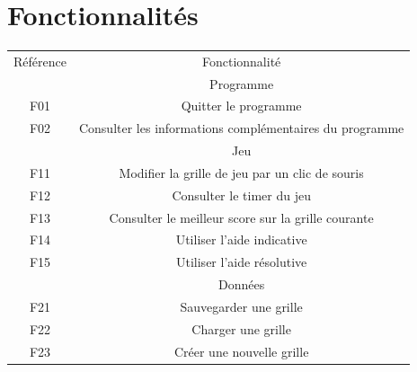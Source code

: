 

\section{Fonctionnalités}
\paragraph*{}
        \begin{tabular*}{0.75\textwidth}{ c | c }
            Référence & Fonctionnalité\\
& Programme \\ 
F01 & Quitter le programme \\
F02 & Consulter les informations complémentaires du programme \\
& Jeu \\ 
F11 & Modifier la grille de jeu par un clic de souris \\
F12 & Consulter le timer du jeu \\
F13 & Consulter le meilleur score sur la grille courante \\
F14 & Utiliser l'aide indicative \\
F15 & Utiliser l'aide résolutive \\
& Données \\ 
F21 & Sauvegarder une grille \\
F22 & Charger une grille \\
F23 & Créer une nouvelle grille \\ %
        \end{tabular*}

